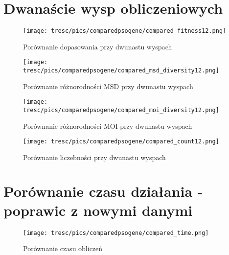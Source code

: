 \section{Dwanaście wysp obliczeniowych}

\begin{figure}[H]
\begin{center} 
\texttt{[image: tresc/pics/comparedpsogene/compared\_fitness12.png]}
\caption{Porównanie dopasowania przy dwunastu wyspach}
\label{fig:compared_fintess12}
\end{center}
\end{figure}

\begin{figure}[H]
\begin{center} 
\texttt{[image: tresc/pics/comparedpsogene/compared\_msd\_diversity12.png]}
\caption{Porównanie różnorodności MSD przy dwunastu wyspach}
\label{fig:compared_msd_diversity12}
\end{center}
\end{figure}

\begin{figure}[H]
\begin{center} 
\texttt{[image: tresc/pics/comparedpsogene/compared\_moi\_diversity12.png]}
\caption{Porównanie różnorodności MOI przy dwunastu wyspach}
\label{fig:compared_moi_diversity12}
\end{center}
\end{figure}

\begin{figure}[H]
\begin{center} 
\texttt{[image: tresc/pics/comparedpsogene/compared\_count12.png]}
\caption{Porównanie liczebności przy dwunastu wyspach}
\label{fig:compared_count12}
\end{center}
\end{figure}



\section{Porównanie czasu działania - poprawic z nowymi danymi}

\begin{figure}[H]
\begin{center} 
\texttt{[image: tresc/pics/comparedpsogene/compared\_time.png]}
\caption{Porównanie czasu obliczeń}
\label{fig:compared_time}
\end{center}
\end{figure}




